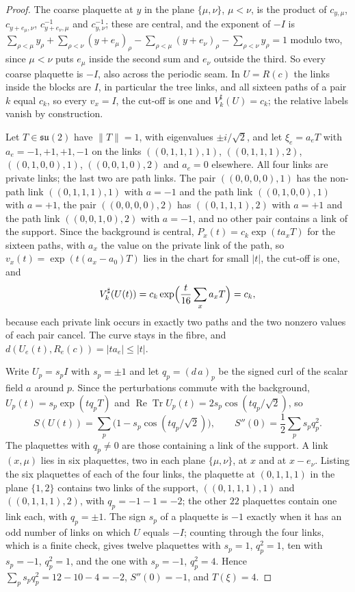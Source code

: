 \documentclass[11pt]{amsart}
\theoremstyle{definition}
\theoremstyle{remark}
\numberwithin{equation}{section}
\newcommand{\ReTr}{\operatorname{Re}\operatorname{Tr}}
\begin{document}
\begin{proof}
The coarse plaquette at $y$ in the plane $\{\mu,\nu\}$, $\mu<\nu$, is the
product of $c_{y,\mu}$, $c_{y+e_\mu,\nu}$, $c_{y+e_\nu,\mu}^{-1}$ and
$c_{y,\nu}^{-1}$; these are central, and the exponent of $-I$ is
$\sum_{\rho<\mu}y_\rho+\sum_{\rho<\nu}(y+e_\mu)_\rho-\sum_{\rho<\mu}(y+e_\nu)_\rho
-\sum_{\rho<\nu}y_\rho=1$ modulo two, since $\mu<\nu$ puts $e_\mu$ inside
the second sum and $e_\nu$ outside the third. So every coarse plaquette is
$-I$, also across the periodic seam. In $U=R(c)$ the links inside the
blocks are $I$, in particular the tree links, and all sixteen paths of a
pair $k$ equal $c_k$, so every $v_x=I$, the cut-off is one and $V^\sharp_k
(U)=c_k$; the relative labels vanish by construction.

Let $T\in\mathfrak{su}(2)$ have $\lVert T\rVert=1$, with eigenvalues $\pm
i/\sqrt2$, and let $\xi_e=a_eT$ with $a_e=-1,+1,+1,-1$ on the links
$((0,1,1,1),1)$, $((0,1,1,1),2)$, $((0,1,0,0),1)$, $((0,0,1,0),2)$ and
$a_e=0$ elsewhere. All four links are private links; the last two are path
links. The pair $((0,0,0,0),1)$ has the non-path link $((0,1,1,1),1)$ with
$a=-1$ and the path link $((0,1,0,0),1)$ with $a=+1$, the pair
$((0,0,0,0),2)$ has $((0,1,1,1),2)$ with $a=+1$ and the path link
$((0,0,1,0),2)$ with $a=-1$, and no other pair contains a link of the
support. Since the background is central, $P_x(t)=c_k\exp(ta_xT)$ for the
sixteen paths, with $a_x$ the value on the private link of the path, so
$v_x(t)=\exp(t(a_x-a_0)T)$ lies in the chart for small $|t|$, the cut-off
is one, and
\[
V^\sharp_k(U(t))=c_k\exp\Bigl(\frac t{16}\sum_xa_xT\Bigr)=c_k ,
\]
because each private link occurs in exactly two paths and the two nonzero
values of each pair cancel. The curve stays in the fibre, and
$d(U_e(t),R_e(c))=|ta_e|\le|t|$.

Write $U_p=s_pI$ with $s_p=\pm1$ and let $q_p=(d\,a)_p$ be the signed
curl of the scalar field $a$ around $p$. Since the perturbations commute
with the background, $U_p(t)=s_p\exp(tq_pT)$ and $\ReTr U_p(t)=2s_p
\cos(tq_p/\sqrt2)$, so
\[
S(U(t))=\sum_p\bigl(1-s_p\cos(tq_p/\sqrt2)\bigr),\qquad
S''(0)=\frac12\sum_ps_pq_p^2 .
\]
The plaquettes with $q_p\ne0$ are those containing a link of the support.
A link $(x,\mu)$ lies in six plaquettes, two in each plane $\{\mu,\nu\}$,
at $x$ and at $x-e_\nu$. Listing the six plaquettes of each of the four
links, the plaquette at $(0,1,1,1)$ in the plane $\{1,2\}$ contains two
links of the support, $((0,1,1,1),1)$ and $((0,1,1,1),2)$, with
$q_p=-1-1=-2$; the other $22$ plaquettes contain one link each, with
$q_p=\pm1$. The sign $s_p$ of a plaquette is
$-1$ exactly when it has an odd number of links on which $U$ equals $-I$;
counting through the four links, which is a finite check, gives twelve
plaquettes with $s_p=1$, $q_p^2=1$, ten with $s_p=-1$, $q_p^2=1$, and the
one with $s_p=-1$, $q_p^2=4$. Hence $\sum_ps_pq_p^2=12-10-4=-2$,
$S''(0)=-1$, and $T(\xi)=4$.


\end{proof}
\end{document}
